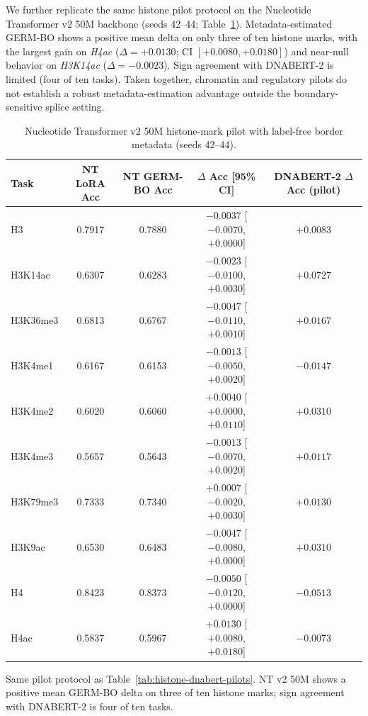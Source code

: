 \documentclass[12pt,letterpaper]{article}
\newcommand{\splitname}[1]{\textit{#1}}
\begin{document}
We further replicate the same histone pilot protocol on the Nucleotide Transformer v2 50M backbone (seeds 42--44; Table~\ref{tab:histone-nt-pilot}). Metadata-estimated GERM-BO shows a positive mean delta on only three of ten histone marks, with the largest gain on \splitname{H4ac} ($\Delta=+0.0130$; CI $[+0.0080, +0.0180]$) and near-null behavior on \splitname{H3K14ac} ($\Delta=-0.0023$). Sign agreement with DNABERT-2 is limited (four of ten tasks). Taken together, chromatin and regulatory pilots do not establish a robust metadata-estimation advantage outside the boundary-sensitive splice setting.

\begin{table}[!htb]
\centering
\caption{Nucleotide Transformer v2 50M histone-mark pilot with label-free border metadata (seeds 42--44).}
\label{tab:histone-nt-pilot}
\footnotesize
\setlength{\tabcolsep}{4pt}
\begin{tabular}{lcccc}
\toprule
Task & NT LoRA Acc & NT GERM-BO Acc & $\Delta$ Acc [95\% CI] & DNABERT-2 $\Delta$ Acc (pilot) \\
\midrule
H3 & 0.7917 & 0.7880 & $-0.0037$ [$-0.0070$, $+0.0000$] & $+0.0083$ \\
H3K14ac & 0.6307 & 0.6283 & $-0.0023$ [$-0.0100$, $+0.0030$] & $+0.0727$ \\
H3K36me3 & 0.6813 & 0.6767 & $-0.0047$ [$-0.0110$, $+0.0010$] & $+0.0167$ \\
H3K4me1 & 0.6167 & 0.6153 & $-0.0013$ [$-0.0050$, $+0.0020$] & $-0.0147$ \\
H3K4me2 & 0.6020 & 0.6060 & $+0.0040$ [$+0.0000$, $+0.0110$] & $+0.0310$ \\
H3K4me3 & 0.5657 & 0.5643 & $-0.0013$ [$-0.0070$, $+0.0020$] & $+0.0117$ \\
H3K79me3 & 0.7333 & 0.7340 & $+0.0007$ [$-0.0020$, $+0.0030$] & $+0.0130$ \\
H3K9ac & 0.6530 & 0.6483 & $-0.0047$ [$-0.0080$, $+0.0000$] & $+0.0310$ \\
H4 & 0.8423 & 0.8373 & $-0.0050$ [$-0.0120$, $+0.0000$] & $-0.0513$ \\
H4ac & 0.5837 & 0.5967 & $+0.0130$ [$+0.0080$, $+0.0180$] & $-0.0073$ \\
\bottomrule
\end{tabular}

Same pilot protocol as Table~\ref{tab:histone-dnabert-pilots}. NT v2 50M shows a positive mean GERM-BO delta on three of ten histone marks; sign agreement with DNABERT-2 is four of ten tasks.
\end{table}
\end{document}
